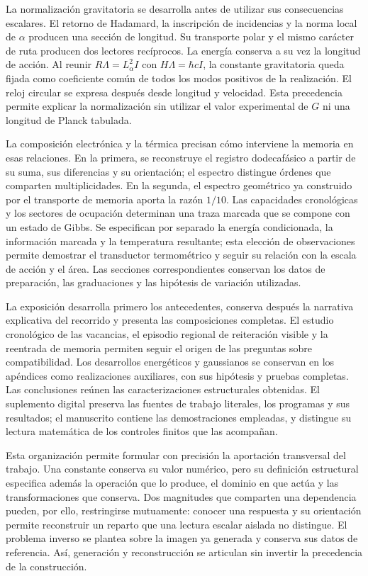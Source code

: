 La normalización gravitatoria se desarrolla antes de utilizar sus
consecuencias escalares. El retorno de Hadamard, la inscripción de incidencias
y la norma local de $\alpha$ producen una sección de longitud. Su
transporte polar y el mismo carácter de ruta producen dos lectores
recíprocos. La energía conserva a su vez la longitud de acción. Al reunir
$R\Lambda=L_\alpha^2I$ con $H\Lambda=\hbar cI$, la constante gravitatoria
queda fijada como coeficiente común de todos los modos positivos de la
realización. El reloj circular se expresa después desde longitud y
velocidad. Esta precedencia permite explicar la normalización sin utilizar
el valor experimental de $G$ ni una longitud de Planck tabulada.

La composición electrónica y la térmica precisan cómo interviene la
memoria en esas relaciones. En la primera, se reconstruye el registro
dodecafásico a partir de su suma, sus diferencias y su orientación;
el espectro distingue órdenes que comparten multiplicidades. En la
segunda, el espectro geométrico ya construido por el transporte de
memoria aporta la razón $1/10$. Las capacidades cronológicas y los
sectores de ocupación determinan una traza marcada que se compone
con un estado de Gibbs. Se especifican por separado la energía
condicionada, la información marcada y la temperatura resultante;
esta elección de observaciones permite demostrar el transductor
termométrico y seguir su relación con la escala de acción y el área.
Las secciones correspondientes conservan los datos de preparación,
las graduaciones y las hipótesis de variación utilizadas.

La exposición desarrolla primero los antecedentes, conserva después la
narrativa explicativa del recorrido y presenta las composiciones completas.
El estudio cronológico de las vacancias, el episodio regional de reiteración
visible y la reentrada de memoria permiten seguir el origen de las
preguntas sobre compatibilidad. Los desarrollos energéticos y gaussianos
se conservan en los apéndices como realizaciones auxiliares, con sus
hipótesis y pruebas completas.
Las conclusiones reúnen las caracterizaciones estructurales obtenidas.
El suplemento digital preserva las fuentes de trabajo literales, los
programas y sus resultados; el manuscrito contiene las demostraciones
empleadas, y distingue su lectura matemática de los controles finitos que
las acompañan.

Esta organización permite formular con precisión la aportación transversal
del trabajo. Una constante conserva su valor numérico, pero su definición
estructural especifica además la operación que lo produce, el dominio en
que actúa y las transformaciones que conserva. Dos magnitudes que comparten
una dependencia pueden, por ello, restringirse mutuamente: conocer una
respuesta y su orientación permite reconstruir un reparto que una lectura
escalar aislada no distingue. El problema inverso se plantea sobre la imagen
ya generada y conserva sus datos de referencia. Así, generación y
reconstrucción se articulan sin invertir la precedencia de la construcción.

